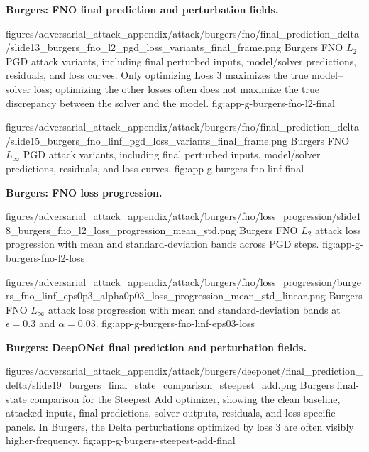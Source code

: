 \documentclass[letterpaper]{article} %
\begin{document}
\noindent\textbf{Burgers: FNO final prediction and perturbation fields.}

\clearpage

\appendixattackfigcompact
  {figures/adversarial_attack_appendix/attack/burgers/fno/final_prediction_delta/slide13_burgers_fno_l2_pgd_loss_variants_final_frame.png}
  {Burgers FNO $L_2$ PGD attack variants, including final perturbed inputs,
  model/solver predictions, residuals, and loss curves. Only optimizing Loss 3
  maximizes the true model--solver loss; optimizing the other losses often does
  not maximize the true discrepancy between the solver and the model.}
  {fig:app-g-burgers-fno-l2-final}

\appendixattackfigcompact
  {figures/adversarial_attack_appendix/attack/burgers/fno/final_prediction_delta/slide15_burgers_fno_linf_pgd_loss_variants_final_frame.png}
  {Burgers FNO $L_\infty$ PGD attack variants, including final perturbed
  inputs, model/solver predictions, residuals, and loss curves.}
  {fig:app-g-burgers-fno-linf-final}

\clearpage

\noindent\textbf{Burgers: FNO loss progression.}

\appendixattackfig
  {figures/adversarial_attack_appendix/attack/burgers/fno/loss_progression/slide18_burgers_fno_l2_loss_progression_mean_std.png}
  {Burgers FNO $L_2$ attack loss progression with mean and standard-deviation
  bands across PGD steps.}
  {fig:app-g-burgers-fno-l2-loss}

\appendixattackfig
  {figures/adversarial_attack_appendix/attack/burgers/fno/loss_progression/burgers_fno_linf_eps0p3_alpha0p03_loss_progression_mean_std_linear.png}
  {Burgers FNO $L_\infty$ attack loss progression with mean and
  standard-deviation bands at $\epsilon=0.3$ and $\alpha=0.03$.}
  {fig:app-g-burgers-fno-linf-eps03-loss}

\FloatBarrier
\noindent\textbf{Burgers: DeepONet final prediction and perturbation fields.}


\appendixattackfig
  {figures/adversarial_attack_appendix/attack/burgers/deeponet/final_prediction_delta/slide19_burgers_final_state_comparison_steepest_add.png}
  {Burgers final-state comparison for the Steepest Add optimizer, showing the
  clean baseline, attacked inputs, final predictions, solver outputs, residuals,
  and loss-specific panels. In Burgers, the Delta perturbations optimized by
  loss 3 are often visibly higher-frequency.}
  {fig:app-g-burgers-steepest-add-final}
\end{document}
